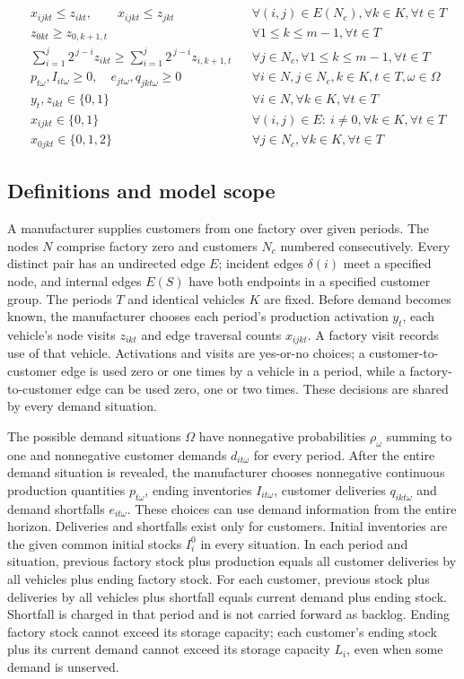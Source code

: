 \documentclass[10pt]{article}
\begin{document}
\begin{align}
\\
&x_{ijkt} \leq z_{ikt},\qquad x_{ijkt} \leq z_{jkt}
&& \forall (i,j) \in E(N_c),\forall k \in K,\forall t \in T
\\
&z_{0kt} \geq z_{0,k+1,t}
&& \forall 1 \leq k \leq m-1,\forall t \in T
\\
&\sum_{i=1}^{j} 2^{\,j-i} z_{ikt} \geq \sum_{i=1}^{j} 2^{\,j-i} z_{i,k+1,t}
&& \forall j \in N_c,\forall 1 \leq k \leq m-1,\forall t \in T
\\
&p_{t\omega},I_{it\omega} \geq 0,\quad e_{jt\omega},q_{jkt\omega}\geq0
&& \forall i\in N,j\in N_c,k\in K,t\in T,\omega\in\Omega
\\
&y_t,z_{ikt} \in \{0,1\}
&& \forall i \in N,\forall k \in K,\forall t \in T
\\
&x_{ijkt} \in \{0,1\}
&& \forall (i,j) \in E:\ i \neq 0,\forall k \in K,\forall t \in T
\\
&x_{0jkt} \in \{0,1,2\}
&& \forall j \in N_c,\forall k \in K,\forall t \in T
\end{align}

\subsection*{Definitions and model scope}
A manufacturer supplies customers from one factory over given periods. The nodes $N$ comprise factory zero and customers $N_c$ numbered consecutively. Every distinct pair has an undirected edge $E$; incident edges $\delta(i)$ meet a specified node, and internal edges $E(S)$ have both endpoints in a specified customer group. The periods $T$ and identical vehicles $K$ are fixed. Before demand becomes known, the manufacturer chooses each period's production activation $y_t$, each vehicle's node visits $z_{ikt}$ and edge traversal counts $x_{ijkt}$. A factory visit records use of that vehicle. Activations and visits are yes-or-no choices; a customer-to-customer edge is used zero or one times by a vehicle in a period, while a factory-to-customer edge can be used zero, one or two times. These decisions are shared by every demand situation.

The possible demand situations $\Omega$ have nonnegative probabilities $\rho_\omega$ summing to one and nonnegative customer demands $d_{it\omega}$ for every period. After the entire demand situation is revealed, the manufacturer chooses nonnegative continuous production quantities $p_{t\omega}$, ending inventories $I_{it\omega}$, customer deliveries $q_{ikt\omega}$ and demand shortfalls $e_{it\omega}$. These choices can use demand information from the entire horizon. Deliveries and shortfalls exist only for customers. Initial inventories are the given common initial stocks $I_i^0$ in every situation. In each period and situation, previous factory stock plus production equals all customer deliveries by all vehicles plus ending factory stock. For each customer, previous stock plus deliveries by all vehicles plus shortfall equals current demand plus ending stock. Shortfall is charged in that period and is not carried forward as backlog. Ending factory stock cannot exceed its storage capacity; each customer's ending stock plus its current demand cannot exceed its storage capacity $L_i$, even when some demand is unserved.
\end{document}
